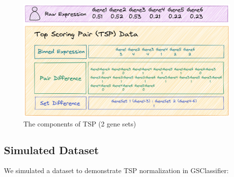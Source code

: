 \documentclass[
  12pt,
]{book}
\begin{document}
\begin{figure}

{\centering \includegraphics[width=0.85\linewidth]{./fig/TSP} 

}

\caption{The components of TSP (2 gene sets)}\label{fig:tsp}
\end{figure}

\hypertarget{simulated-dataset}{%
\subsection{Simulated Dataset}\label{simulated-dataset}}

We simulated a dataset to demonstrate TSP normalization in GSClassifier:
\end{document}
